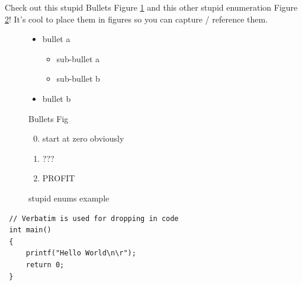 \documentclass[oneside,english,chapters]{smireport}
\begin{document}
Check out this stupid Bullets Figure \ref{fig:bullets} and this other stupid enumeration Figure \ref{fig:enum}!
It's cool to place them in figures so you can capture / reference them.

\begin{figure}[H] %
\begin{itemize}
  \item bullet a
  \begin{itemize}
    \item sub-bullet a
    \item sub-bullet b
  \end{itemize}
  \item bullet b
\end{itemize}
\caption{Bullets Fig}\label{fig:bullets}
\end{figure}

\begin{figure}
\begin{enumerate}
  \setcounter{enumi}{-1} %
  \item start at zero obviously
  \item ???
  \item PROFIT
\end{enumerate}
\caption{stupid enums example}\label{fig:enum}
\end{figure}

\begin{verbatim}
 // Verbatim is used for dropping in code
 int main()
 {
     printf("Hello World\n\r");
     return 0;
 }
\end{verbatim}


\end{document}
